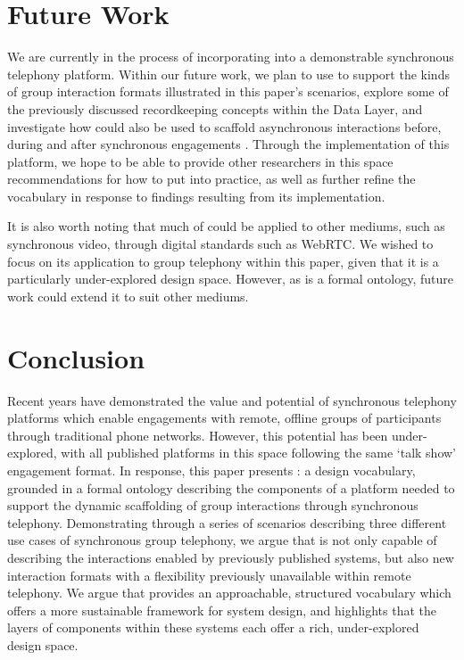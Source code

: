 \section{Future Work}

We are currently in the process of incorporating \ONT{} into a demonstrable synchronous telephony platform. Within our future work, we plan to use \ONT{} to support the kinds of group interaction formats illustrated in this paper's scenarios, explore some of the previously discussed recordkeeping concepts within the Data Layer, and investigate how \ONT{} could also be used to scaffold asynchronous interactions before, during and after synchronous engagements \cite{Yadav2017}. Through the implementation of this platform, we hope to be able to provide other researchers in this space recommendations for how to put \ONT{} into practice, as well as further refine the vocabulary in response to findings resulting from its implementation.

It is also worth noting that much of \ONT{} could be applied to other mediums, such as synchronous video, through digital standards such as WebRTC. We wished to focus on its application to group telephony within this paper, given that it is a particularly under-explored design space. However, as \ONT{} is a formal ontology, future work could extend it to suit other mediums.

\section{Conclusion}

Recent years have demonstrated the value and potential of synchronous telephony platforms which enable engagements with remote, offline groups of participants through traditional phone networks. However, this potential has been under-explored, with all published platforms in this space following the same `talk show' engagement format. In response, this paper presents \ONT{}: a design vocabulary, grounded in a formal ontology describing the components of a platform needed to support the dynamic scaffolding of group interactions through synchronous telephony. Demonstrating through a series of scenarios describing three different use cases of synchronous group telephony, we argue that \ONT{} is not only capable of describing the interactions enabled by previously published systems, but also new interaction formats with a flexibility previously unavailable within remote telephony. We argue that \ONT{} provides an approachable, structured vocabulary which offers a more sustainable framework for system design, and highlights that the layers of components within these systems each offer a rich, under-explored design space.